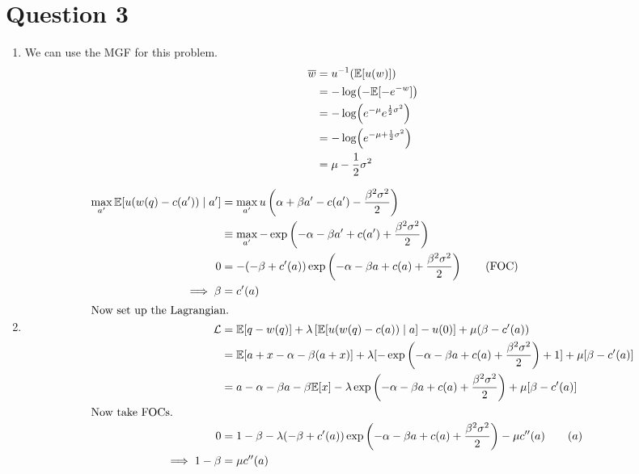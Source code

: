 \section{Question 3}
\begin{enumerate}[label=\alph*)]
\item We can use the MGF for this problem.
  \begin{align*}
    \overline{w} &= u^{-1}(\mathbb{E}[u(w)])\\
                 &= -\log (-\mathbb{E}[-e^{-w}])\\
                 &= -\log(e^{-\mu}e^{\frac{1}{2} \sigma^2})\\
                 &= -\log (e^{- \mu + \frac{1}{2}\sigma^2})\\
    &= \mu - \frac{1}{2}\sigma^2
  \end{align*}
\item
  \begin{align*}
    \max_{a^\prime} \E[u(w(q) - c(a^\prime)) \mid a^\prime] &= \max_{a^\prime} u\left(\alpha + \beta a^\prime - c(a^\prime) - \frac{\beta^2 \sigma^2}{2}\right)\\
                                                &\equiv \max_{a^\prime} - \exp \left(-\alpha - \beta a^\prime + c(a^\prime) + \frac{\beta^2 \sigma^2}{2}\right)\\
    0 &= - (- \beta + c^\prime(a)) \exp\left(-\alpha - \beta a + c(a) + \frac{\beta^2 \sigma^2}{2}\right)  \tag{FOC}\\
    \implies \beta &= c^\prime(a)\\
    \intertext{Now set up the Lagrangian.}
    \mathcal{L} &= \E[q - w(q)] + \lambda \left[\E[u(w(q) - c(a)) \mid a] - u(0)\right] + \mu(\beta - c^\prime (a))\\
                                                            &= \E[a + x - \alpha - \beta (a + x)] + \lambda[-\exp\left(- \alpha - \beta a + c(a) + \frac{\beta^2 \sigma^2}{2}\right) + 1] + \mu [\beta - c^\prime(a)] \\
                                                            &= a - \alpha - \beta a - \beta \E[x] - \lambda \exp\left(- \alpha - \beta a + c(a) + \frac{\beta^2 \sigma^2}{2}\right) + \mu[\beta - c^\prime(a)]\\
    \intertext{Now take FOCs.}
    0 &= 1 - \beta - \lambda (-\beta + c^\prime(a)) \exp \left(-\alpha - \beta a + c(a) + \frac{\beta^2 \sigma^2}{2}\right) - \mu c^{\prime \prime} (a) \tag{$a$}\\
    \implies 1 - \beta &= \mu c^{\prime \prime} (a) \\

\end{align*}
\end{enumerate}
